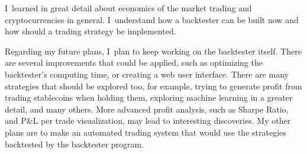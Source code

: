 I~learned in great detail about economics of the market trading and cryptocurrencies in general. I~understand how a backtester can be built now and how should a trading strategy be implemented.

Regarding my future plans, I~plan to keep working on the backtester itself. There are several improvements that could be applied, such as optimizing the backtester's computing time, or creating a web user interface. There are many strategies that should be explored too, for example, trying to generate profit from trading stablecoins when holding them, exploring machine learning in a greater detail, and many others. More advanced profit analysis, such as Sharpe Ratio, and P\&L per trade visualization, may lead to interesting discoveries. My other plans are to make an automated trading system that would use the strategies backtested by the backtester program.
